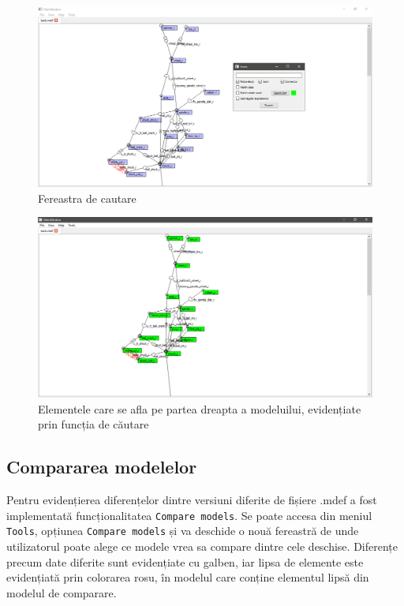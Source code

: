 \begin{figure}[H]
    \includegraphics[width=\linewidth]{imagini/implementare/searchwindow.png}
    \caption{Fereastra de cautare}
    \label{fig:tabs}
\end{figure}

\begin{figure}[H]
    \includegraphics[width=\linewidth]{imagini/implementare/searchscene.png}
    \caption{Elementele care se afla pe partea dreapta a modeluilui, evidențiate prin funcția de căutare}
    \label{fig:tabs}
\end{figure}

\subsection{Compararea modelelor}
Pentru evidențierea diferențelor dintre versiuni diferite de 
fișiere .mdef a fost implementată funcționalitatea \verb|Compare models|. Se poate accesa din meniul \verb|Tools|, opțiunea \verb|Compare models| și va deschide 
o nouă fereastră de unde utilizatorul poate alege ce modele vrea sa compare dintre cele deschise. Diferențe precum date diferite sunt evidențiate cu galben,
iar lipsa de elemente este evidențiată prin colorarea rosu, în modelul care conține elementul lipsă din modelul de comparare.\newline 

